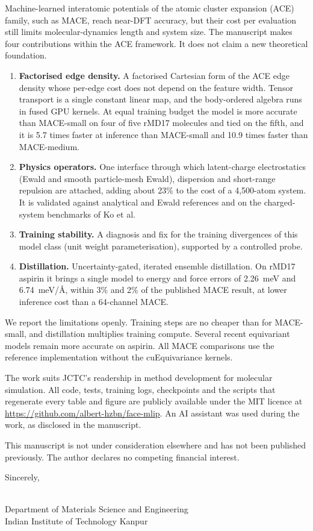\documentclass[11pt]{article}
\begin{document}
Machine-learned interatomic potentials of the atomic cluster expansion (ACE) family, such as MACE, reach near-DFT
accuracy, but their cost per evaluation still limits molecular-dynamics length and system size. The manuscript makes
four contributions within the ACE framework. It does not claim a new theoretical foundation.
\begin{enumerate}[leftmargin=1.6em, itemsep=2pt, topsep=0pt, parsep=0pt]
\item \textbf{Factorised edge density.} A factorised Cartesian form of the ACE edge density whose per-edge cost
does not depend on the feature width. Tensor transport is a single constant linear map, and the body-ordered algebra
runs in fused GPU kernels. At equal training budget the model is more accurate than MACE-small on four of five rMD17
molecules and tied on the fifth, and it is 5.7 times faster at inference than MACE-small and 10.9 times faster than
MACE-medium.
\item \textbf{Physics operators.} One interface through which latent-charge electrostatics (Ewald and smooth
particle-mesh Ewald), dispersion and short-range repulsion are attached, adding about 23\% to the cost of a 4,500-atom system. It is validated against
analytical and Ewald references and on the charged-system benchmarks of Ko et al.
\item \textbf{Training stability.} A diagnosis and fix for the training divergences of this model class (unit
weight parameterisation), supported by a controlled probe.
\item \textbf{Distillation.} Uncertainty-gated, iterated ensemble distillation. On rMD17 aspirin it brings a single
model to energy and force errors of 2.26~meV and 6.74~meV/\AA, within 3\% and 2\% of the published MACE result, at
lower inference cost than a 64-channel MACE.
\end{enumerate}

We report the limitations openly. Training steps are no cheaper than for MACE-small, and distillation multiplies
training compute. Several recent equivariant models remain more accurate on aspirin. All MACE comparisons use the
reference implementation without the cuEquivariance kernels.

The work suits JCTC's readership in method development for molecular simulation. All code, tests, training logs,
checkpoints and the scripts that regenerate every table and figure are publicly available under the MIT licence at
\url{https://github.com/albert-hzbn/face-mlip}. An AI assistant was used during the work, as disclosed in the
manuscript.

This manuscript is not under consideration elsewhere and has not been published previously. The author declares no
competing financial interest.

Sincerely,

\vspace{1.2cm}
\AuthorName\\
Department of Materials Science and Engineering\\
Indian Institute of Technology Kanpur
\end{document}
